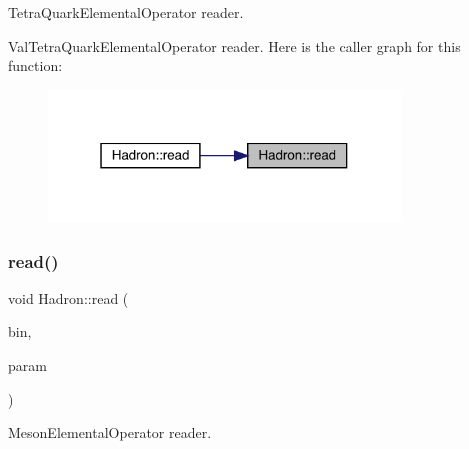 Tetra\+Quark\+Elemental\+Operator reader. 

Val\+Tetra\+Quark\+Elemental\+Operator reader. Here is the caller graph for this function\+:
\nopagebreak
\begin{figure}[H]
\begin{center}
\leavevmode
\includegraphics[width=265pt]{d1/daf/namespaceHadron_a614faa9c1c7ae1880f009d5c9aa672ec_icgraph}
\end{center}
\end{figure}
\mbox{\label{namespaceHadron_ae34c01603f5e8f9246374fddfaa8e062}} 
\subsubsection{\texorpdfstring{read()}{read()}\hspace{0.1cm}{\footnotesize\ttfamily [58/94]}}
{\footnotesize\ttfamily void Hadron\+::read (\begin{DoxyParamCaption}\item[{\mbox{\hyperlink{classADATIO_1_1BinaryReader}{Binary\+Reader}} \&}]{bin,  }\item[{\mbox{\hyperlink{structHadron_1_1ValMesonElementalOperator__t}{Val\+Meson\+Elemental\+Operator\+\_\+t}} \&}]{param }\end{DoxyParamCaption})}



Meson\+Elemental\+Operator reader. 

